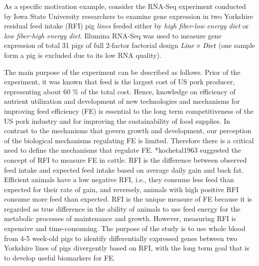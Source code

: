 \documentclass[12pt, letter]{article}\usepackage[]{graphicx}\usepackage[]{color}
\begin{document}
As a specific motivation example, consider the RNA-Seq experiment conducted by Iowa State University  researchers to examine gene expression in two Yorkshire residual feed intake (RFI) pig \emph{lines} feeded either by \emph{high fiber-low energy diet} or \emph{low fiber-high energy diet}. Illumina RNA-Seq was used to measure gene expression of total 31 pigs  of full 2-factor factorial design $\emph{Line} \times \emph{Diet}$ (one sample form a pig is excluded due to its low RNA quality). 

The main purpose of the experiment  can be described as follows. Prior of the experiment, it was known that feed is the largest cost of US pork producer, representing about 60 \% of the total cost. Hence, knowledge on efficiency of nutrient utilization and development of new technologies and mechanisms for improving feed efficiency (FE) is essential to the long term competitiveness of the US pork industry and for improving the sustainability of food supplies. In contrast to the mechanisms that govern  growth and development, our perception of the biological mechanisms regulating FE is limited. Therefore there is a critical need to define the mechanisms that regulate FE. \citeasnoun**{kochetal1963}  suggested the concept of RFI to measure FE in cattle. RFI is the difference between observed feed intake and expected feed intake based on average daily gain and back fat. Efficient animals have a low negative RFI, i.e., they consume less feed than expected for their rate of gain, and reversely, animals with high positive RFI consume more feed than expected. RFI is the unique measure of FE because it is regarded as true difference in the ability of animals to use feed energy for the metabolic processes of maintenance and growth. However, measuring RFI is expensive and time-consuming. The purpose of the study is to use whole blood from 4-5 week-old pigs  to identify differentially expressed genes between two Yorkshire lines of pigs divergently based on RFI, with the long term goal that is to  develop useful biomarkers for FE. 
\end{document}
